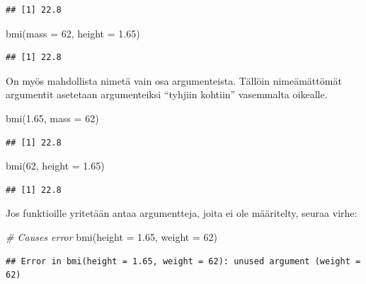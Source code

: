 \documentclass[
]{book}
\newenvironment{Shaded}{\begin{snugshade}}{\end{snugshade}}
\newcommand{\AttributeTok}[1]{\textcolor[rgb]{0.77,0.63,0.00}{#1}}
\newcommand{\CommentTok}[1]{\textcolor[rgb]{0.56,0.35,0.01}{\textit{#1}}}
\newcommand{\DecValTok}[1]{\textcolor[rgb]{0.00,0.00,0.81}{#1}}
\newcommand{\FloatTok}[1]{\textcolor[rgb]{0.00,0.00,0.81}{#1}}
\newcommand{\FunctionTok}[1]{\textcolor[rgb]{0.00,0.00,0.00}{#1}}
\newcommand{\NormalTok}[1]{#1}
\begin{document}
\begin{verbatim}
## [1] 22.8
\end{verbatim}

\begin{Shaded}
\begin{Highlighting}[]
\FunctionTok{bmi}\NormalTok{(}\AttributeTok{mass =} \DecValTok{62}\NormalTok{, }\AttributeTok{height =} \FloatTok{1.65}\NormalTok{)}
\end{Highlighting}
\end{Shaded}

\begin{verbatim}
## [1] 22.8
\end{verbatim}

On myös mahdollista nimetä vain osa argumenteista. Tällöin nimeämättömät argumentit asetetaan argumenteiksi ``tyhjiin kohtiin'' vasemmalta oikealle.

\begin{Shaded}
\begin{Highlighting}[]
\FunctionTok{bmi}\NormalTok{(}\FloatTok{1.65}\NormalTok{, }\AttributeTok{mass =} \DecValTok{62}\NormalTok{)}
\end{Highlighting}
\end{Shaded}

\begin{verbatim}
## [1] 22.8
\end{verbatim}

\begin{Shaded}
\begin{Highlighting}[]
\FunctionTok{bmi}\NormalTok{(}\DecValTok{62}\NormalTok{, }\AttributeTok{height =} \FloatTok{1.65}\NormalTok{)}
\end{Highlighting}
\end{Shaded}

\begin{verbatim}
## [1] 22.8
\end{verbatim}

Jos funktioille yritetään antaa argumentteja, joita ei ole määritelty, seuraa virhe:

\begin{Shaded}
\begin{Highlighting}[]
\CommentTok{\# Causes error}
\FunctionTok{bmi}\NormalTok{(}\AttributeTok{height =} \FloatTok{1.65}\NormalTok{, }\AttributeTok{weight =} \DecValTok{62}\NormalTok{)}
\end{Highlighting}
\end{Shaded}

\begin{verbatim}
## Error in bmi(height = 1.65, weight = 62): unused argument (weight = 62)
\end{verbatim}
\end{document}
